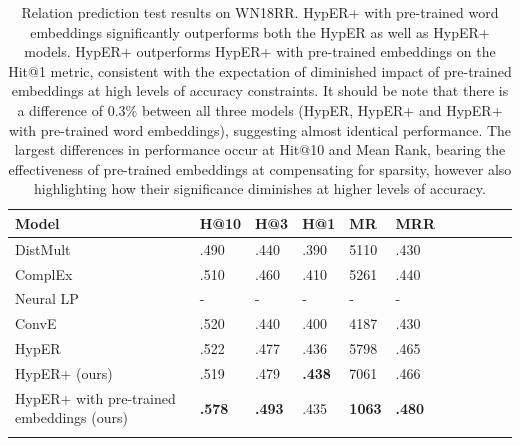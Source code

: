 
\begin{table}[H]
		\centering
		\begin{tabular}{lllllllllll}
  			\textbf{Model} & \textbf{H@10} & \textbf{H@3} & \textbf{H@1} & \textbf{MR} & \textbf{MRR} \\
  			\hline
  			DistMult \unskip~\citep{yang2014embedding} & .490 & .440 & .390 & 5110 & .430 \\
  			ComplEx \unskip~\citep{trouillon2016complex} & .510 & .460 & .410 & 5261 & .440 \\
  			Neural LP \unskip~\citep{yang2017differentiable} & - & - & - & - & - \\
			ConvE \unskip~\citep{dettmers2018convolutional} & .520 & .440 & .400 & 4187 & .430 \\
			HypER \unskip~\citep{balazevic2019hypernetwork} & .522 & .477 & .436 & 5798 & .465 \\
			HypER+ (ours) & .519 & .479 & \textbf{.438} & 7061 & .466 \\
  			\hline
  			HypER+ with pre-trained embeddings (ours) & \textbf{.578} & \textbf{.493} & .435 & \textbf{1063} & \textbf{.480} \\
			&
		\end{tabular}
		\captionsetup{justification=centering}
		\caption{Relation prediction test results on WN18RR. HypER+ with pre-trained word embeddings significantly outperforms both the HypER as well as HypER+ models. HypER+ outperforms HypER+ with pre-trained embeddings on the Hit@1 metric, consistent with the expectation of diminished impact of pre-trained embeddings at high levels of accuracy constraints. It should be note that there is a difference of $ 0.3 \% $ between all three models (HypER, HypER+ and HypER+ with pre-trained word embeddings), suggesting almost identical performance. The largest differences in performance occur at Hit@10 and Mean Rank, bearing the effectiveness of pre-trained embeddings at compensating for sparsity, however also highlighting how their significance diminishes at higher levels of accuracy. }
\end{table}

